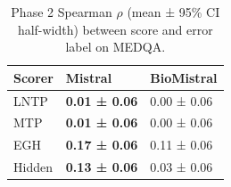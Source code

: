\begin{table}
\caption{Phase 2 Spearman $\rho$ (mean ± 95\% CI half-width) between score and error label on MEDQA.}
\label{tab:phase2_spearman_medqa}
\begin{tabular}{lll}
\toprule
Scorer & Mistral & BioMistral \\
\midrule
LNTP & \textbf{0.01 ± 0.06} & 0.00 ± 0.06 \\
MTP & \textbf{0.01 ± 0.06} & 0.00 ± 0.06 \\
EGH & \textbf{0.17 ± 0.06} & 0.11 ± 0.06 \\
Hidden & \textbf{0.13 ± 0.06} & 0.03 ± 0.06 \\
\bottomrule
\end{tabular}
\end{table}
